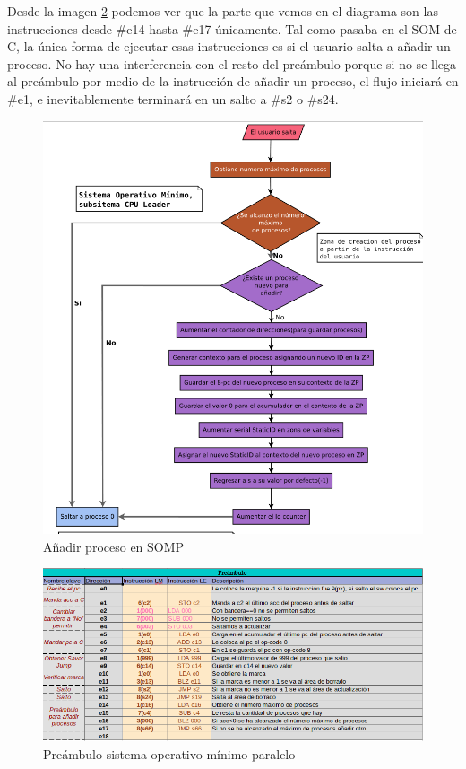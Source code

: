 \documentclass[letterpaper,12pt,oneside]{book}
\begin{document}
                Desde la imagen \ref{fig:somp_preambulo} podemos
		 		ver que la parte que vemos en el diagrama son las instrucciones desde \#e14 hasta \#e17 únicamente. Tal como pasaba en el SOM de C, la única
		 		forma de ejecutar esas instrucciones es si el usuario salta a añadir un proceso. No hay una interferencia con el resto del preámbulo porque si no se llega al preámbulo por medio de la instrucción de añadir un proceso, el flujo iniciará en \#e1, e inevitablemente terminará en un salto a \#s2 o \#s24.
		 		
		 	
			\begin{figure}[h]		
				\centering
				\includegraphics[scale=0.45]{media/Paralela/Diagrama_SOP_add_process.png}
				\caption{ Añadir proceso en SOMP}
				\label{fig:diag_sop_add_process}
			\end{figure}	 		 			

	 		

			\begin{figure}[h]		
				\centering
				\includegraphics[scale=0.55]{media/Paralela/somp_preambulo.png}
				\caption{ Preámbulo sistema operativo mínimo paralelo}
				\label{fig:somp_preambulo}
			\end{figure}	
			
\end{document}
